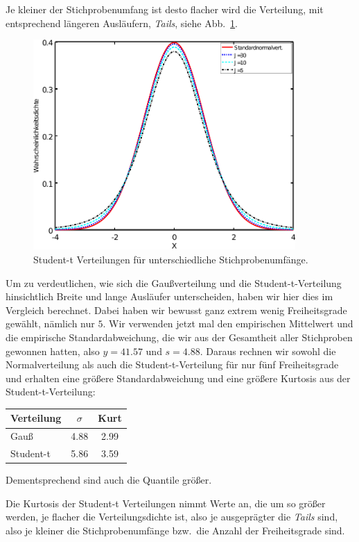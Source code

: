 Je kleiner der Stichprobenumfang ist desto flacher wird die Verteilung, mit entsprechend
längeren Ausläufern, \textsl{Tails}, siehe
Abb.~\ref{studentt}.
\begin{figure}
\begin{center}
\includegraphics[width=100mm]{05_vorlesung/media/learn_Student_tpdf.pdf}
\caption{\label{studentt} Student-t Verteilungen für unterschiedliche Stichprobenumfänge.}
\end{center}
\end{figure}
Um zu verdeutlichen, wie sich die Gaußverteilung und die Student-t-Verteilung hinsichtlich
Breite und lange Ausläufer unterscheiden, haben wir hier dies im Vergleich berechnet.
Dabei haben wir bewusst ganz extrem wenig Freiheitsgrade gewählt, nämlich nur $5$.
Wir verwenden jetzt mal den empirischen Mittelwert und die empirische Standardabweichung,
die wir aus der Gesamtheit aller Stichproben gewonnen hatten, also $y = 41.57$
und $s = 4.88$. Daraus rechnen wir sowohl die Normalverteilung als auch die
Student-t-Verteilung für nur fünf Freiheitsgrade und erhalten eine größere Standardabweichung
und eine größere Kurtosis aus der Student-t-Verteilung:
\begin{center}
\begin{tabular}{l||c|c}
\hline
Verteilung & $\sigma$ & Kurt\\
\hline
Gauß &   4.88 &  2.99 \\
Student-t &  5.86 &  3.59 \\
\hline
\end{tabular}
\end{center}
Dementsprechend sind auch die Quantile größer.


Die Kurtosis
der Student-t Verteilungen nimmt Werte an, die um so größer werden, je flacher die Verteilungsdichte
ist, also je ausgeprägter die \textsl{Tails} sind, also je kleiner die Stichprobenumfänge bzw.\ die 
Anzahl der Freiheitsgrade sind.

